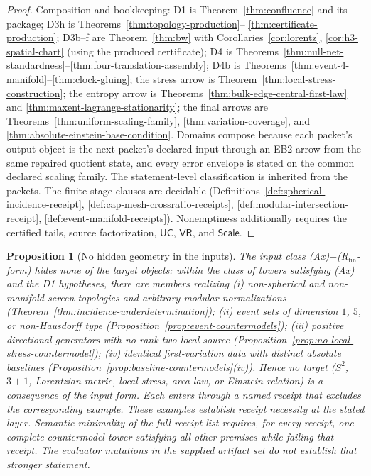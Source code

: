 \documentclass[11pt]{article}
\newtheorem{proposition}[theorem]{Proposition}
\begin{document}
\begin{proof}
Composition and bookkeeping: D1 is Theorem~\ref{thm:confluence} and its
package; D3h is Theorems~\ref{thm:topology-production}--%
\ref{thm:certificate-production}; D3b--f are
Theorem~\ref{thm:bw} with Corollaries~\ref{cor:lorentz},
\ref{cor:h3-spatial-chart} (using the produced certificate); D4 is
Theorems~\ref{thm:null-net-standardness}--\ref{thm:four-translation-assembly};
D4b is Theorems~\ref{thm:event-4-manifold}--\ref{thm:clock-gluing}; the
stress arrow is Theorem~\ref{thm:local-stress-construction}; the entropy
arrow is Theorems~\ref{thm:bulk-edge-central-first-law} and
\ref{thm:maxent-lagrange-stationarity}; the final arrows are
Theorems~\ref{thm:uniform-scaling-family},
\ref{thm:variation-coverage}, and
\ref{thm:absolute-einstein-base-condition}. Domains compose because each
packet's output object is the next packet's declared input through an EB2
arrow from the same repaired quotient state, and every error envelope is
stated on the common declared scaling family. The statement-level
classification is inherited from the packets. The finite-stage clauses are
decidable (Definitions~\ref{def:spherical-incidence-receipt},
\ref{def:cap-mesh-crossratio-receipts},
\ref{def:modular-intersection-receipt},
\ref{def:event-manifold-receipts}). Nonemptiness additionally requires the
certified tails, source factorization, \(\mathsf{UC}\), \(\mathsf{VR}\), and
\(\mathsf{Scale}\).
\end{proof}

\begin{proposition}[No hidden geometry in the inputs]
\label{prop:no-hidden-geometry}
The input class (Ax)\(+\)(R\(_{\mathrm{fin}}\)-\emph{form}) hides none of the
target objects: within the class of towers satisfying (Ax) and the D1
hypotheses, there are members realizing
(i) non-spherical and non-manifold screen topologies and arbitrary modular
normalizations (Theorem~\ref{thm:incidence-underdetermination});
(ii) event sets of dimension \(1\), \(5\), or non-Hausdorff type
(Proposition~\ref{prop:event-countermodels});
(iii) positive directional generators with no rank-two local source
(Proposition~\ref{prop:no-local-stress-countermodel});
(iv) identical first-variation data with distinct absolute baselines
(Proposition~\ref{prop:baseline-countermodels}(iv)).
Hence no target (\(S^2\), \(3{+}1\), Lorentzian metric, local stress,
area law, or Einstein relation) is a consequence of the input form. Each
enters through a named receipt that excludes the corresponding example.
These examples establish receipt necessity at the stated layer. Semantic
minimality of the full receipt list requires, for every receipt, one complete
countermodel tower satisfying all other premises while failing that receipt.
The evaluator mutations in the supplied artifact set do not establish that stronger statement.
\end{proposition}
\end{document}
